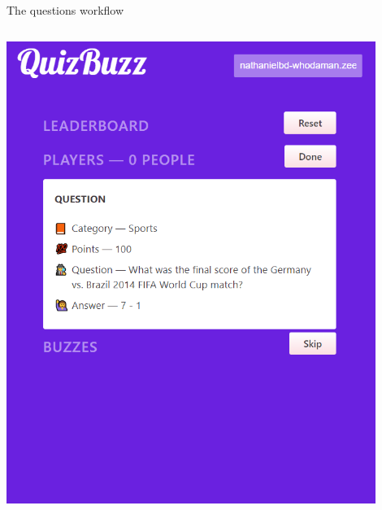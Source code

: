 \documentclass{beamer}
\begin{document}
\begin{frame}{The questions workflow}
{\begin{columns}
\begin{column}{0.5\textwidth}
			\includegraphics[width=0.9\textwidth]{figs/admin-question.png}
		\end{column}
	\end{columns}
	}
\end{frame}
\end{document}
